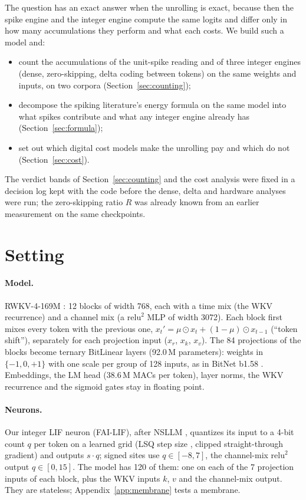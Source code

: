 \documentclass[11pt]{article}
\begin{document}
The question has an exact answer when the unrolling is exact, because then the spike engine and
the integer engine compute the same logits and differ only in how many accumulations they
perform and what each costs. We build such a model and:
\begin{itemize}
\item count the accumulations of the unit-spike reading and of three integer engines (dense,
  zero-skipping, delta coding between tokens) on the same weights and inputs, on two corpora
  (Section~\ref{sec:counting});
\item decompose the spiking literature's energy formula on the same model into what spikes
  contribute and what any integer engine already has (Section~\ref{sec:formula});
\item set out which digital cost models make the unrolling pay and which do not
  (Section~\ref{sec:cost}).
\end{itemize}
The verdict bands of Section~\ref{sec:counting} and the cost analysis were fixed in a decision
log kept with the code before the dense, delta and hardware analyses were run; the
zero-skipping ratio $R$ was already known from an earlier measurement on the same checkpoints.

\section{Setting}
\label{sec:setting}

\paragraph{Model.} RWKV-4-169M \citep{peng2023rwkv}: 12 blocks of width 768, each with a time
mix (the WKV recurrence) and a channel mix (a $\mathrm{relu}^2$ MLP of width 3072). Each block
first mixes every token with the previous one, $x_t' = \mu \odot x_t + (1 - \mu) \odot x_{t-1}$
(``token shift''), separately for each projection input ($x_r$, $x_k$, $x_v$). The 84
projections of the blocks become ternary BitLinear layers (92.0\,M parameters): weights in
$\{-1, 0, +1\}$ with one scale per group of 128 inputs, as in BitNet b1.58 \citep{ma2024era}.
Embeddings, the LM head (38.6\,M MACs per token), layer norms, the WKV recurrence and the
sigmoid gates stay in floating point.

\paragraph{Neurons.} Our integer LIF neuron (FAI-LIF), after NSLLM \citep{xu2025nsllm},
quantizes its input to a 4-bit count $q$ per token on a learned grid (LSQ step size
\citep{esser2020lsq}, clipped straight-through gradient) and outputs $s \cdot q$; signed sites
use $q \in [-8, 7]$, the channel-mix $\mathrm{relu}^2$ output $q \in [0, 15]$. The model has 120
of them: one on each of the 7 projection inputs of each block, plus the WKV inputs $k$, $v$ and
the channel-mix output. They are stateless; Appendix~\ref{app:membrane} tests a membrane.
\end{document}
